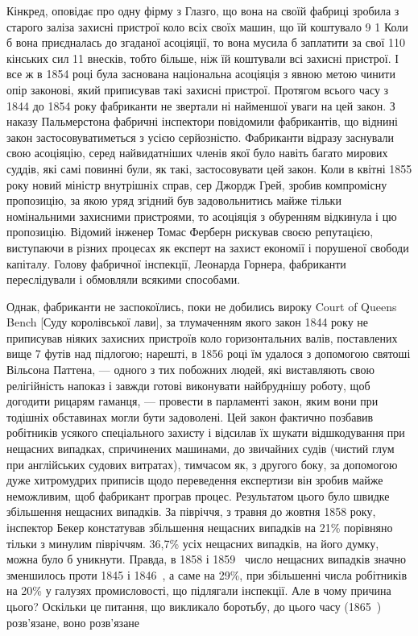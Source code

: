 \parcont{}  %
Кінкред, оповідає про одну фірму з Глазго, що вона на своїй
фабриці зробила з старого заліза захисні пристрої коло всіх
своїх машин, що їй коштувало 9 1
Коли б вона приєдналась до згаданої асоціяції, то вона мусила б
заплатити за свої 110 кінських сил 11 внесків,
тобто більше, ніж їй коштували всі захисні пристрої. І все ж
в 1854 році була заснована національна асоціяція з явною метою
чинити опір законові, який приписував такі захисні пристрої.
Протягом всього часу з 1844 до 1854 року фабриканти не звертали
ні найменшої уваги на цей закон. З наказу Пальмерстона
фабричні інспектори повідомили фабрикантів, що віднині закон
застосовуватиметься з усією серйозністю. Фабриканти відразу
заснували свою асоціяцію, серед найвидатніших членів якої було
навіть багато мирових суддів, які самі повинні були, як такі, застосовувати цей закон. Коли в квітні
1855 року новий міністр
внутрішніх справ, сер Джордж Грей, зробив компромісну пропозицію, за якою уряд згідний був
задовольнитись майже тільки
номінальними захисними пристроями, то асоціяція з обуренням
відкинула і цю пропозицію. Відомий інженер Томас Ферберн
рискував своєю репутацією, виступаючи в різних процесах як
експерт на захист економії і порушеної свободи капіталу. Голову
фабричної інспекції, Леонарда Горнера, фабриканти переслідували і обмовляли всякими способами.

Однак, фабриканти не заспокоїлись, поки не добились вироку
Court of Queens Bench [Суду королівської лави], за тлумаченням
якого закон 1844 року не приписував ніяких захисних пристроїв коло горизонтальних валів, поставлених
вище 7 футів над
підлогою; нарешті, в 1856 році їм удалося з допомогою святоші
Вільсона Паттена, — одного з тих побожних людей, які виставляють
свою релігійність напоказ і завжди готові виконувати найбруднішу
роботу, щоб догодити рицарям гаманця, — провести в парламенті
закон, яким вони при тодішніх обставинах могли бути задоволені.
Цей закон фактично позбавив робітників усякого спеціального захисту і відсилав їх шукати
відшкодування при нещасних випадках,
спричинених машинами, до звичайних судів (чистий глум при
англійських судових витратах), тимчасом як, з другого боку,
за допомогою дуже хитромудрих приписів щодо переведення
експертизи він зробив майже неможливим, щоб фабрикант програв процес. Результатом цього було швидке
збільшення нещасних випадків. За півріччя, з травня до жовтня 1858 року,
інспектор Бекер констатував збільшення нещасних випадків на
21\% порівняно тільки з минулим півріччям. 36,7\% усіх нещасних
випадків, на його думку, можна було б уникнути. Правда,
в 1858 і 1859~ число нещасних випадків значно зменшилось
проти 1845 і 1846~, а саме на 29\%, при збільшенні числа робітників на 20\% у галузях
промисловості, що підлягали інспекції.
Але в чому причина цього? Оскільки це питання, що викликало
боротьбу, до цього часу (1865~) розв’язане, воно розв’язане
\parbreak{}  %
